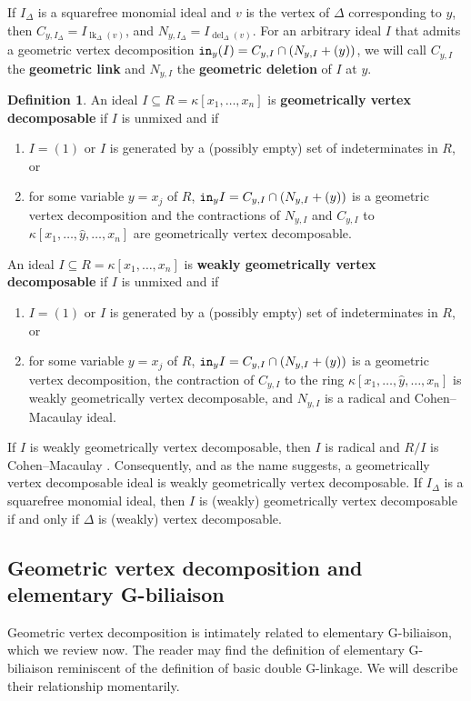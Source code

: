 \documentclass[12pt, reqno]{amsart}
\numberwithin{equation}{section}
\newtheorem{Main Conjecture}[theorem]{Main Conjecture}
\theoremstyle{definition}
\newtheorem{defn}[theorem]{Definition}
\theoremstyle{plain}
\newcommand{\init}{{\tt in}}
\DeclareMathOperator{\lk}{lk}
\DeclareMathOperator{\del}{del}
\begin{document}
If $I_\Delta$ is a squarefree monomial ideal and $v$ is the vertex of $\Delta$ corresponding to $y$, then $C_{y,I_\Delta} = I_{\lk_{\Delta} (v)}$, and $N_{y,I_\Delta} = I_{\del_{\Delta} (v)}$.  For an arbitrary ideal $I$ that admits a geometric vertex decomposition $\init_{y}(I) = C_{y,I} \cap (N_{y,I}+(y))$, we will call $C_{y, I}$ the \textbf{geometric link} and $N_{y, I}$ the \textbf{geometric deletion} of $I$ at $y$.
 
\begin{defn}\label{def:gvd}
An ideal $I\subseteq R = \kappa[x_1, \ldots, x_n]$ is \textbf{geometrically vertex decomposable} if $I$ is unmixed and if
\begin{enumerate}
\item $I = ( 1)$ or $I$ is generated by a (possibly empty) set of indeterminates in $R$, or
\item for some variable $y = x_j$ of $R$, 
$\init_y I =  C_{y,I}  \cap (N_{y,I}+ (y))$ is a geometric vertex decomposition and the contractions of $N_{y,I}$ and $C_{y,I}$ to $\kappa[x_1,\dots,\widehat{y},\dots, x_n]$ are geometrically vertex decomposable.
\end{enumerate}
\end{defn}

An ideal $I\subseteq R = \kappa[x_1, \ldots, x_n]$ is \textbf{weakly geometrically vertex decomposable} if $I$ is unmixed and if
\begin{enumerate}
\item $I = ( 1)$ or $I$ is generated by a (possibly empty) set of indeterminates in $R$, or
\item for some variable $y = x_j$ of $R$, 
$\init_y I = C_{y,I} \cap (N_{y,I}+(y))$ is a geometric vertex decomposition, the contraction of $C_{y,I}$ to the ring $\kappa[x_1,\dots,\widehat{y},\dots, x_n]$ is weakly geometrically vertex decomposable, and $N_{y,I}$ is a radical and Cohen--Macaulay ideal.
\end{enumerate}


If $I$ is weakly geometrically vertex decomposable, then $I$ is radical and $R/I$ is Cohen--Macaulay \cite[Corollary 4.8]{KR21}.  Consequently, and as the name suggests, a geometrically vertex decomposable ideal is weakly geometrically vertex decomposable. If $I_\Delta$ is a squarefree monomial ideal, then $I$ is (weakly) geometrically vertex decomposable if and only if $\Delta$ is (weakly) vertex decomposable. 

\subsection{Geometric vertex decomposition and elementary G-biliaison}\label{ss:gvd-and-elementary-G-biliaison}
Geometric vertex decomposition is intimately related to elementary G-biliaison, which we review now.  The reader may find the definition of elementary G-biliaison reminiscent of the definition of basic double G-linkage. We will describe their relationship momentarily.
\end{document}
